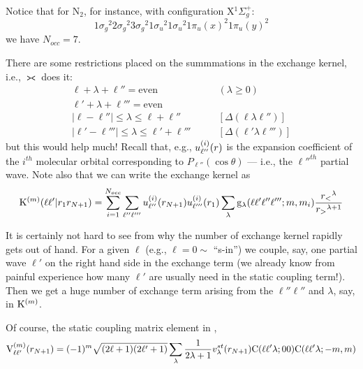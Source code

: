 \documentclass[aps,pra,groupedaddress,12pt,
               amsfonts,amssymb,
               preprint
    ]{revtex4}
\begin{document}
Notice that for N$_2$, for instance, with configuration X$^1\Sigma_g^+$:
\begin{equation*}
  1\sigma_g{}^2 2\sigma_g{}^2 3\sigma_g{}^2 1\sigma_u{}^2 1\sigma_u{}^2
  1\pi_u(x)^2 1\pi_u(y)^2
\end{equation*}
we have $N_{occ} = 7$.

There are some restrictions placed on the summmations in the exchange
kernel, i.e., $\gla$ does it:
\begin{subequations}
  \begin{align}
    \label{eq:glres}
    \ell + \lambda + \ell''  = \text{even} & \qquad (\lambda \geq 0) \\
    \ell' + \lambda + \ell''' = \text{even}& \\
    |\ell - \ell''| \leq \lambda  \leq \ell + \ell'' & \qquad
    [\Delta(\ell\lambda\ell'')]     \label{eq:glresc} \\
    |\ell' - \ell'''| \leq \lambda \leq \ell' + \ell'''& \qquad
    [\Delta(\ell'\lambda\ell''')] \label{eq:glresd}
  \end{align}
\end{subequations}
but this would help much! Recall that, e.g., $u_{\ell''}^{(i)}(r)$ is the expansion
coefficient of the $i^{th}$ molecular orbital corresponding to
$P_{\ell''}(\cos\theta)$ --- i.e., the $\ell''^{th}$ partial wave. Note
also that we can write the exchange kernel as
\begin{equation}
  \label{eq:KEXa}
  \mathrm{K}^{(m)}(\ell\ell'|r_1r_{N+1}) = \sum_{i=1}^{N_{occ}}\sum_{\ell''\ell'''}
  u_{\ell''}^{(i)}(r_{N+1})u_{\ell'''}^{(i)}(r_1)\sum_{\lambda}\mathrm{g}_{\lambda}(\ell\ell'\ell''\ell''';m,m_i)\dfrac{r_<{}^\lambda}{r_>{}^{\lambda+1}}
\end{equation}

It is certainly not hard to see from  why the number of exchange
kernel rapidly gets out of hand. For a given $\ell$ (e.g., $\ell = 0
\sim$ ``s-in'') we couple, say, one partial wave $\ell'$ on the right
hand side in the exchange term (we already know from painful experience
how many $\ell'$ are usually need in the static coupling term!). Then we
get a huge number of exchange term arising from the $\ell''\ell''$ and
$\lambda$, say, in $\mathrm{K}^{(m)}$.

Of course, the static coupling matrix element in ,
\begin{equation}
  \label{eq:mvsta}
  \mathrm{V}_{\ell\ell'}^{(m)}(r_{N+1}) = (-1)^{m}\sqrt{(2\ell+1)(2\ell'+1)}
                        \sum_{\lambda}\dfrac{1}{2\lambda+1}v_\lambda^{st}(r_{N+1})
                        \mathrm{C}(\ell\ell'\lambda;00)\mathrm{C}(\ell\ell'\lambda;-m,m)
\end{equation}
\end{document}
